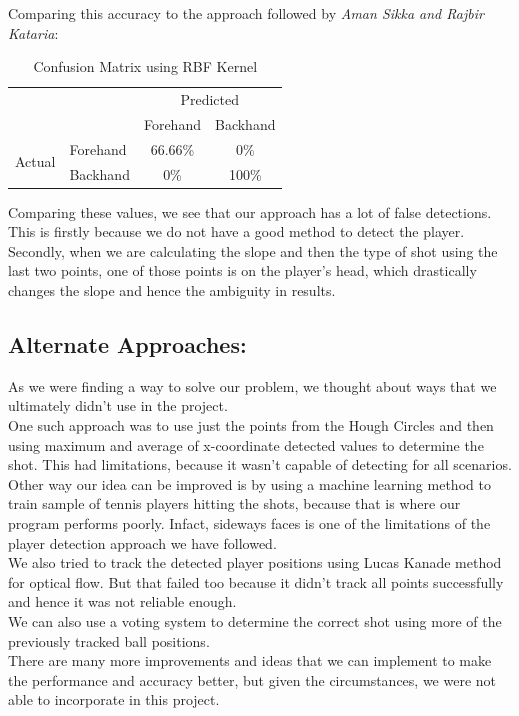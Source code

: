 \documentclass[10.5pt]{proc}
\begin{document}
	Comparing this accuracy to the approach followed by \emph{Aman Sikka and Rajbir Kataria}\cite{stanford2012}:
	\begin{table}[h]
	\caption{Confusion Matrix using RBF Kernel}
	\label{my-label}
	\begin{tabular}{ll|c|c|}
	\cline{3-4}
	                                              &          & \multicolumn{2}{c|}{Predicted}                                \\ \cline{3-4} 
	                                              &          & \multicolumn{1}{l|}{Forehand} & \multicolumn{1}{l|}{Backhand} \\ \hline
	\multicolumn{1}{|c|}{\multirow{2}{*}{Actual}} & Forehand & 66.66\%                          & 0\%                          \\ \cline{2-4} 
	\multicolumn{1}{|c|}{}                        & Backhand & 0\%                          & 100\%                          \\ \hline
	\end{tabular}
	\end{table}

	Comparing these values, we see that our approach has a lot of false detections. This is firstly because we do not have a good method to detect the player. Secondly, when we are calculating the slope and then the type of shot using the last two points, one of those points is on the player's head, which drastically changes the slope and hence the ambiguity in results.

	\subsection{Alternate Approaches:}
	As we were finding a way to solve our problem, we thought about ways that we ultimately didn't use in the project.\\
	One such approach was to use just the points from the Hough Circles and then using maximum and average of x-coordinate detected values to determine the shot. This had limitations, because it wasn't capable of detecting for all scenarios.\\
	Other way our idea can be improved is by using a machine learning method to train sample of tennis players hitting the shots, because that is where our program performs poorly. Infact, sideways faces is one of the limitations of the player detection approach we have followed.\\
	We also tried to track the detected player positions using Lucas Kanade method for optical flow. But that failed too because it didn't track all points successfully and hence it was not reliable enough.\\
	We can also use a voting system to determine the correct shot using more of the previously tracked ball positions.\\
	There are many more improvements and ideas that we can implement to make the performance and accuracy better, but given the circumstances, we were not able to incorporate in this project.\\
\end{document}
